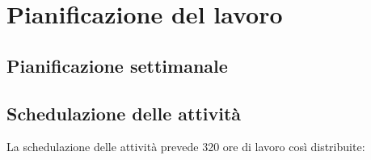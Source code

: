 
\section{Pianificazione del lavoro}

\subsection{Pianificazione settimanale}
\prospettoSettimanale


\subsection{Schedulazione delle attività}

La schedulazione delle attività prevede 320 ore di lavoro così distribuite:

\begin{center}
    
\end{center}

